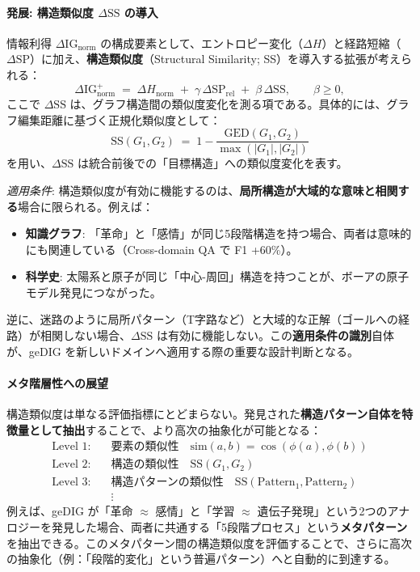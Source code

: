 \documentclass[ja=standard,xelatex]{bxjsarticle}
\newcommand{\ignorm}{\Delta\mathrm{IG}_{\mathrm{norm}}}
\begin{document}
\paragraph{発展: 構造類似度 $\Delta\mathrm{SS}$ の導入}\label{sec:structural_similarity_extension}
情報利得 $\ignorm$ の構成要素として、エントロピー変化（$\Delta H$）と経路短縮（$\Delta\mathrm{SP}$）に加え、\textbf{構造類似度}（Structural Similarity; SS）を導入する拡張が考えられる：
\begin{equation}
\ignorm^{+}\;=\;\Delta H_{\mathrm{norm}}\; +\; \gamma\,\Delta \mathrm{SP}_{\mathrm{rel}}\; +\; \beta\,\Delta \mathrm{SS},\qquad \beta\ge 0,\label{eq:ignorm_extended}
\end{equation}
ここで $\Delta\mathrm{SS}$ は、グラフ構造間の類似度変化を測る項である。具体的には、グラフ編集距離に基づく正規化類似度として：
\begin{equation}
\mathrm{SS}(G_1, G_2)\;=\;1 - \frac{\mathrm{GED}(G_1, G_2)}{\max(|G_1|, |G_2|)}
\end{equation}
を用い、$\Delta\mathrm{SS}$ は統合前後での「目標構造」への類似度変化を表す。

\noindent\textit{適用条件}: 構造類似度が有効に機能するのは、\textbf{局所構造が大域的な意味と相関する}場合に限られる。例えば：
\begin{itemize}[leftmargin=1.6em]
  \item \textbf{知識グラフ}: 「革命」と「感情」が同じ5段階構造を持つ場合、両者は意味的にも関連している（Cross-domain QA で F1 +60\%）。
  \item \textbf{科学史}: 太陽系と原子が同じ「中心-周回」構造を持つことが、ボーアの原子モデル発見につながった。
\end{itemize}
逆に、迷路のように局所パターン（T字路など）と大域的な正解（ゴールへの経路）が相関しない場合、$\Delta\mathrm{SS}$ は有効に機能しない。この\textbf{適用条件の識別}自体が、geDIG を新しいドメインへ適用する際の重要な設計判断となる。

\paragraph{メタ階層性への展望}\label{sec:meta_hierarchy}
構造類似度は単なる評価指標にとどまらない。発見された\textbf{構造パターン自体を特徴量として抽出}することで、より高次の抽象化が可能となる：
\begin{align*}
\text{Level 1:} \quad & \text{要素の類似性} \quad \mathrm{sim}(a, b) = \cos(\phi(a), \phi(b)) \\
\text{Level 2:} \quad & \text{構造の類似性} \quad \mathrm{SS}(G_1, G_2) \\
\text{Level 3:} \quad & \text{構造パターンの類似性} \quad \mathrm{SS}(\mathrm{Pattern}_1, \mathrm{Pattern}_2) \\
& \vdots
\end{align*}
例えば、geDIG が「革命 $\approx$ 感情」と「学習 $\approx$ 遺伝子発現」という2つのアナロジーを発見した場合、両者に共通する「5段階プロセス」という\textbf{メタパターン}を抽出できる。このメタパターン間の構造類似度を評価することで、さらに高次の抽象化（例：「段階的変化」という普遍パターン）へと自動的に到達する。
\end{document}
